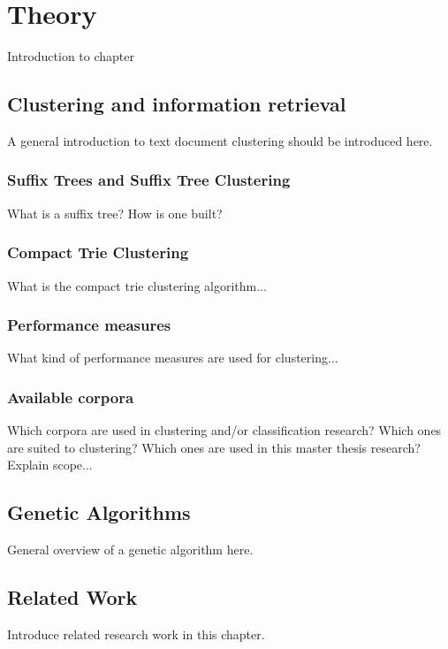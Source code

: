 
\chapter{Theory} %
\label{Theory} %

Introduction to chapter

\section{Clustering and information retrieval}
\label{Clustering}
A general introduction to text document clustering should be introduced here.

\subsection{Suffix Trees and Suffix Tree Clustering}
What is a suffix tree? How is one built?

\subsection{Compact Trie Clustering}
What is the compact trie clustering algorithm...

\subsection{Performance measures}
What kind of performance measures are used for clustering...

\subsection{Available corpora}
Which corpora are used in clustering and/or classification research? Which ones are suited to clustering? Which ones are used in this master thesis research? Explain scope...


\section{Genetic Algorithms}
\label{GeneticAlgorithm}
General overview of a genetic algorithm here.


\section{Related Work}
\label{RelatedWork}
Introduce related research work in this chapter.